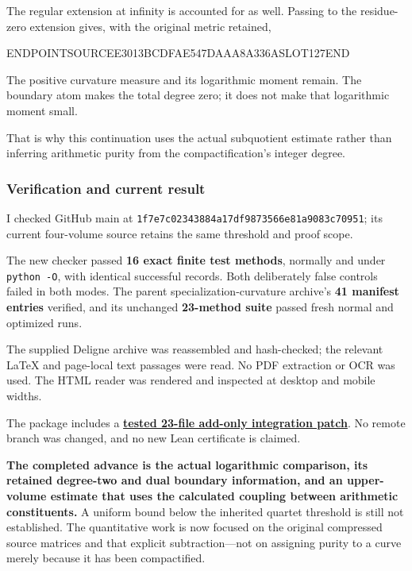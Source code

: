 The regular extension at infinity is accounted for as well. Passing to the residue-zero extension gives, with the original metric retained,

ENDPOINTSOURCEE3013BCDFAE547DAAA8A336ASLOT127END

The positive curvature measure and its logarithmic moment remain. The boundary atom makes the total degree zero; it does not make that logarithmic moment small.

That is why this continuation uses the actual subquotient estimate rather than inferring arithmetic purity from the compactification's integer degree.

\subsubsection{Verification and current result}\label{endpoint-exponential_constituent_original--verification-and-current-result}

I checked GitHub main at \texttt{1f7e7c02343884a17df9873566e81a9083c70951}; its current four-volume source retains the same threshold and proof scope.

The new checker passed \textbf{16 exact finite test methods}, normally and under \texttt{python\ -O}, with identical successful records. Both deliberately false controls failed in both modes. The parent specialization-curvature archive's \textbf{41 manifest entries} verified, and its unchanged \textbf{23-method suite} passed fresh normal and optimized runs.

The supplied Deligne archive was reassembled and hash-checked; the relevant LaTeX and page-local text passages were read. No PDF extraction or OCR was used. The HTML reader was rendered and inspected at desktop and mobile widths.

The package includes a \href{sources/endpoint_user_sources/HISTORICAL_DOWNLOAD_LINKS.md}{\textbf{tested 23-file add-only integration patch}}. No remote branch was changed, and no new Lean certificate is claimed.

\textbf{The completed advance is the actual logarithmic comparison, its retained degree-two and dual boundary information, and an upper-volume estimate that uses the calculated coupling between arithmetic constituents.} A uniform bound below the inherited quartet threshold is still not established. The quantitative work is now focused on the original compressed source matrices and that explicit subtraction---not on assigning purity to a curve merely because it has been compactified.
